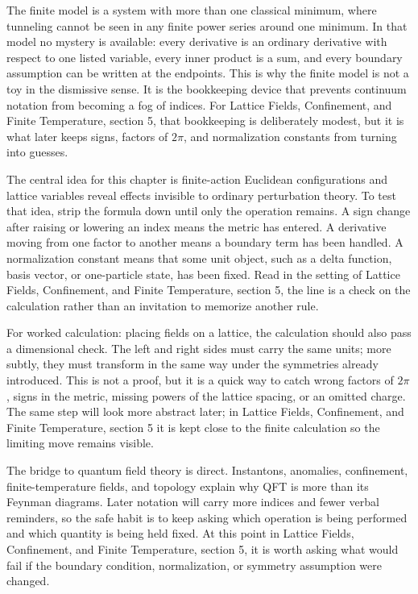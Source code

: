 The finite model is a system with more than one classical minimum, where tunneling cannot be seen in any finite power series around one minimum.  In that model no mystery is available: every derivative is an ordinary derivative with respect to one listed variable, every inner product is a sum, and every boundary assumption can be written at the endpoints.  This is why the finite model is not a toy in the dismissive sense.  It is the bookkeeping device that prevents continuum notation from becoming a fog of indices.  For Lattice Fields, Confinement, and Finite Temperature, section 5, that bookkeeping is deliberately modest, but it is what later keeps signs, factors of \(2\pi\), and normalization constants from turning into guesses.

The central idea for this chapter is finite-action Euclidean configurations and lattice variables reveal effects invisible to ordinary perturbation theory.  To test that idea, strip the formula down until only the operation remains.  A sign change after raising or lowering an index means the metric has entered.  A derivative moving from one factor to another means a boundary term has been handled.  A normalization constant means that some unit object, such as a delta function, basis vector, or one-particle state, has been fixed.  Read in the setting of Lattice Fields, Confinement, and Finite Temperature, section 5, the line is a check on the calculation rather than an invitation to memorize another rule.

For worked calculation: placing fields on a lattice, the calculation should also pass a dimensional check.  The left and right sides must carry the same units; more subtly, they must transform in the same way under the symmetries already introduced.  This is not a proof, but it is a quick way to catch wrong factors of \(2\pi\), signs in the metric, missing powers of the lattice spacing, or an omitted charge.  The same step will look more abstract later; in Lattice Fields, Confinement, and Finite Temperature, section 5 it is kept close to the finite calculation so the limiting move remains visible.

The bridge to quantum field theory is direct.  Instantons, anomalies, confinement, finite-temperature fields, and topology explain why QFT is more than its Feynman diagrams.  Later notation will carry more indices and fewer verbal reminders, so the safe habit is to keep asking which operation is being performed and which quantity is being held fixed.  At this point in Lattice Fields, Confinement, and Finite Temperature, section 5, it is worth asking what would fail if the boundary condition, normalization, or symmetry assumption were changed.

